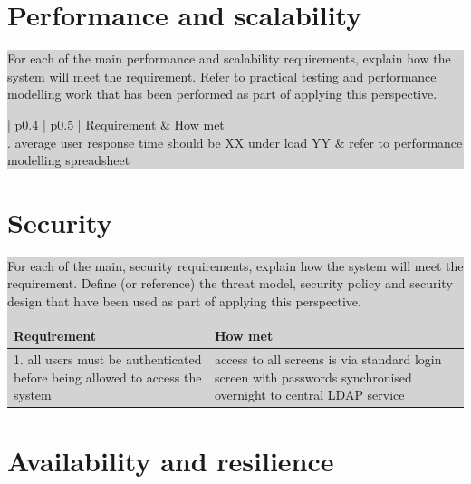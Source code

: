 \documentclass[a4paper,11pt]{report}
\newcommand{\instructions}[1]{
  \noindent\colorbox{lightgray}{%
    \parbox{\linewidth}{%
      #1
    }%
  }%
 \vspace{0.1cm}
}
\begin{document}
\section{Performance and scalability}
\label{sec:perf-scal}

\instructions{
For each of the main performance and scalability requirements, explain
how the system will meet the requirement. Refer to practical testing
and performance modelling work that has been performed as part of
applying this perspective.

\begin{center}
  \begin{tabular}[h!]{| p{0.4\textwidth} | p{0.5\textwidth} |}
    \hline
    \rowcolor{gray}
    Requirement & How met \\
    \hline
    \hline
    1. average user response time should be XX under load YY & refer
    to performance modelling spreadsheet\\

    \hline
 \end{tabular}
\end{center}

}

\section{Security}
\label{sec:security}

\instructions{
For each of the main, security requirements, explain how the system
will meet the requirement. Define (or reference) the threat model,
security policy and security design that have been used as part of
applying this perspective.

\begin{center}
  \begin{tabular}[h!]{| p{0.4\textwidth} | p{0.5\textwidth} |}
    \hline
    \rowcolor{gray}
    Requirement & How met \\
    \hline
    \hline
    1. all users must be authenticated before being allowed to access
    the system & access to all screens is via standard login screen
    with passwords synchronised overnight to central LDAP service\\

    \hline
 \end{tabular}
\end{center}

}


\section{Availability and resilience}
\label{sec:avail-resil}
\end{document}
